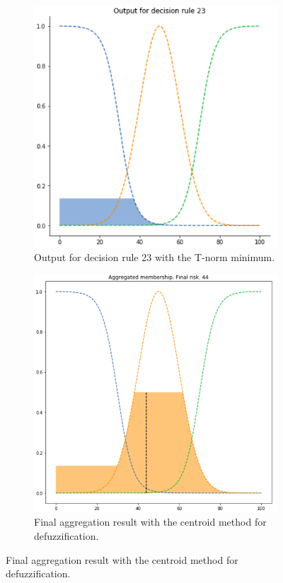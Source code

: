 \begin{figure}[ht]
\begin{subfigure}{.5\textwidth}
  \centering
  \includegraphics[width=.8\linewidth]{figures/third/min3.png}  
  \caption{Output for decision rule 23 with the T-norm minimum.}
  \label{fig:3min3}
\end{subfigure}
\begin{subfigure}{.5\textwidth}
  \centering
  \includegraphics[width=.8\linewidth]{figures/third/min-centroid.png}  
  \caption{Final aggregation result with the centroid method for defuzzification.}
  \label{fig:3min-centroid}
\end{subfigure}

\end{figure}

